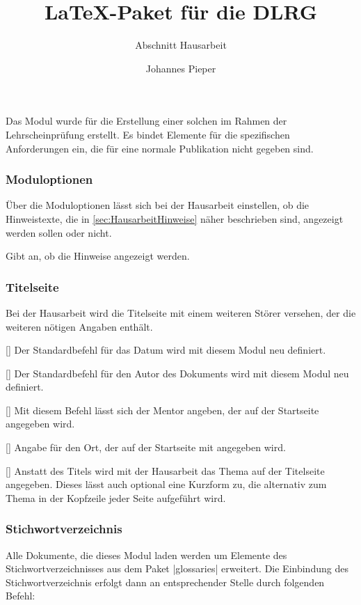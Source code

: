 \documentclass[
    a4paper,
    12pt,
    parskip=half,
]{scrartcl}
\title{\LaTeX{}-Paket für die DLRG}
\subtitle{Abschnitt Hausarbeit}
\author{Johannes Pieper}
\begin{document}
Das Modul  wurde für die Erstellung einer solchen im Rahmen der Lehrscheinprüfung erstellt. Es bindet Elemente für die spezifischen Anforderungen ein, die für eine normale Publikation nicht gegeben sind.

\subsubsection{Moduloptionen}
Über die Moduloptionen lässt sich bei der Hausarbeit einstellen, ob die Hinweistexte, die in \autoref{sec:HausarbeitHinweise} näher beschrieben sind, angezeigt werden sollen oder nicht.

\begin{options}
        Gibt an, ob die Hinweise angezeigt werden.
        \label{option:hinweise}
\end{options}

\subsubsection{Titelseite}
Bei der Hausarbeit wird die Titelseite mit einem weiteren Störer versehen, der die weiteren nötigen Angaben enthält.

\begin{commands}
    []
    Der Standardbefehl für das Datum wird mit diesem Modul neu definiert.

    []
    Der Standardbefehl für den Autor des Dokuments wird mit diesem Modul neu definiert.

    []
    Mit diesem Befehl lässt sich der Mentor angeben, der auf der Startseite angegeben wird.

    []
    Angabe für den Ort, der auf der Startseite mit angegeben wird.

    []
    Anstatt des Titels wird mit der Hausarbeit das Thema auf der Titelseite angegeben. Dieses lässt auch optional eine Kurzform zu, die alternativ zum Thema in der Kopfzeile jeder Seite aufgeführt wird.
\end{commands}

\subsubsection{Stichwortverzeichnis}
Alle Dokumente, die dieses Modul laden werden um Elemente des Stichwortverzeichnisses aus dem Paket \verbcode|glossaries| erweitert. Die Einbindung des Stichwortverzeichnis erfolgt dann an entsprechender Stelle durch folgenden Befehl:
\end{document}
